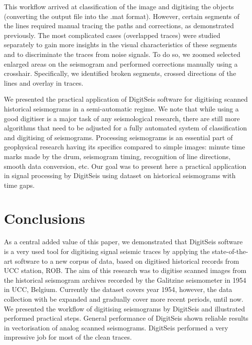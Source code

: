 \documentclass[sensors,article,submit,moreauthors,pdftex]{Definitions/mdpi}
\begin{document}
This workflow arrived at classification of the image and digitising the objects (converting the output file into the .mat format). However, certain segments of the lines required manual tracing the paths and corrections, as demonstrated previously. The most complicated cases (overlapped traces) were studied separately to gain more insights in the visual characteristics of these segments and to discriminate the traces from noise signals. To do so, we zoomed selected enlarged areas on the seismogram and performed corrections manually using a crosshair. Specifically, we identified broken segments, crossed directions of the lines and overlay in traces. 

We presented the practical application of DigitSeis software for digitising scanned historical seismograms in a semi-automatic regime. We note that while using a good digitiser is a major task of any seismological research, there are still more algorithms that need to be adjusted for a fully automated system of classification and digitising of seismograms. Processing seismograms is an essential part of geophysical research having its specifics compared to simple images: minute time marks made by the drum, seismogram timing, recognition of line directions, smooth data conversion, etc. Our goal was to present here a practical application in signal processing by DigitSeis using dataset on historical seismograms with time gaps.

\section{Conclusions}

As a central added value of this paper, we demonstrated that DigitSeis software is a very used tool for digitising signal seismic traces by applying the state-of-the-art software to a new corpus of data, based on digitised historical records from \ac{UCC} station, \ac{ROB}. The aim of this research was to digitise scanned images from the historical seismogram archives recorded by the Galitzine seismometer in 1954 in \ac{UCC}, Belgium. Currently the dataset covers year 1954, however, the data collection with be expanded and gradually cover more recent periods, until now. We presented the workflow of digitising seismograms by DigitSeis and illustrated performed practical steps. General performance of DigitSeis shown reliable results in vectorisation of analog scanned seismograms. DigitSeis performed a very impressive job for most of the clean traces. 
\end{document}
